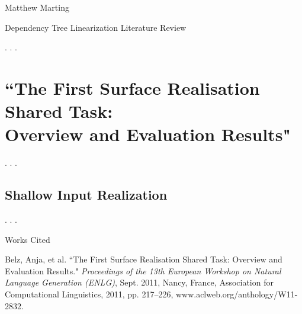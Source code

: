 \documentclass[12pt,letterpaper]{article}
\def \mylastname {Marting}
\def \myname {Matthew \mylastname{}}
\newenvironment{workscited}{
  \newcommand{\bibentry}{\noindent{}\hangindent=0.5in}
  \newpage{}
  {\centering{}Works Cited\par{}}
}{\newpage{}}
\begin{document}
\begin{flushleft}
  \myname{}\\
  {\centering{}Dependency Tree Linearization Literature Review\par{}}
  \setlength{\parindent}{0.5in}
  . . .
  \section*{``The First Surface Realisation Shared Task:\\
  Overview and Evaluation Results"}
  . . .
  \subsection*{Shallow Input Realization}. . .
  \begin{workscited}
    \bibentry{}Belz, Anja, et al. ``The First Surface Realisation Shared Task: Overview and Evaluation Results." \textit{Proceedings of the 13th European Workshop on Natural Language Generation (ENLG)}, Sept. 2011, Nancy, France, Association for Computational Linguistics, 2011, pp. 217--226, www.aclweb.org/anthology/W11-2832.
  \end{workscited}
\end{flushleft}
\end{document}
